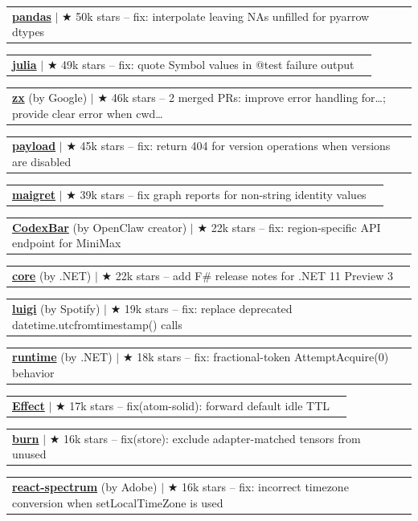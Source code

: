 \documentclass[letterpaper,11pt]{article}
\makeatletter
\newcommand{\resumeProjectHeading}[2]{
    \item
    \begin{tabular*}{0.97\textwidth}{l@{\extracolsep{\fill}}r}
      \small#1 & \hspace{8pt}\small#2 \\
    \end{tabular*}\vspace{-11.4pt}
}
\makeatother
\begin{document}
      \resumeProjectHeading{\textbf{\href{https://github.com/pandas-dev/pandas/pull/66117}{pandas}} $|$ {\small $\bigstar$ 50k stars} \textnormal{ -- fix: interpolate leaving NAs unfilled for pyarrow dtypes}}{}
      \resumeProjectHeading{\textbf{\href{https://github.com/JuliaLang/julia/pull/61054}{julia}} $|$ {\small $\bigstar$ 49k stars} \textnormal{ -- fix: quote Symbol values in @test failure output}}{}
      \resumeProjectHeading{\textbf{\href{https://github.com/google/zx/pulls?q=is\%3Apr\%20is\%3Amerged\%20author\%3Aapoorvdarshan}{zx}} \textnormal{(by Google)} $|$ {\small $\bigstar$ 46k stars} \textnormal{ -- 2 merged PRs: improve error handling for…; provide clear error when cwd…}}{}
      \resumeProjectHeading{\textbf{\href{https://github.com/payloadcms/payload/pull/18057}{payload}} $|$ {\small $\bigstar$ 45k stars} \textnormal{ -- fix: return 404 for version operations when versions are disabled}}{}
      \resumeProjectHeading{\textbf{\href{https://github.com/soxoj/maigret/pull/3046}{maigret}} $|$ {\small $\bigstar$ 39k stars} \textnormal{ -- fix graph reports for non-string identity values}}{}
      \resumeProjectHeading{\textbf{\href{https://github.com/steipete/CodexBar/pull/344/commits}{CodexBar}} \textnormal{(by OpenClaw creator)} $|$ {\small $\bigstar$ 22k stars} \textnormal{ -- fix: region-specific API endpoint for MiniMax}}{}
      \resumeProjectHeading{\textbf{\href{https://github.com/dotnet/core/pull/10349}{core}} \textnormal{(by .NET)} $|$ {\small $\bigstar$ 22k stars} \textnormal{ -- add F\# release notes for .NET 11 Preview 3}}{}
      \resumeProjectHeading{\textbf{\href{https://github.com/spotify/luigi/pull/3410}{luigi}} \textnormal{(by Spotify)} $|$ {\small $\bigstar$ 19k stars} \textnormal{ -- fix: replace deprecated datetime.utcfromtimestamp() calls}}{}
      \resumeProjectHeading{\textbf{\href{https://github.com/dotnet/runtime/pull/124498}{runtime}} \textnormal{(by .NET)} $|$ {\small $\bigstar$ 18k stars} \textnormal{ -- fix: fractional-token AttemptAcquire(0) behavior}}{}
      \resumeProjectHeading{\textbf{\href{https://github.com/Effect-TS/effect/pull/7533}{Effect}} $|$ {\small $\bigstar$ 17k stars} \textnormal{ -- fix(atom-solid): forward default idle TTL}}{}
      \resumeProjectHeading{\textbf{\href{https://github.com/tracel-ai/burn/pull/5536}{burn}} $|$ {\small $\bigstar$ 16k stars} \textnormal{ -- fix(store): exclude adapter-matched tensors from unused}}{}
      \resumeProjectHeading{\textbf{\href{https://github.com/adobe/react-spectrum/pull/9678}{react-spectrum}} \textnormal{(by Adobe)} $|$ {\small $\bigstar$ 16k stars} \textnormal{ -- fix: incorrect timezone conversion when setLocalTimeZone is used}}{}
\end{document}
